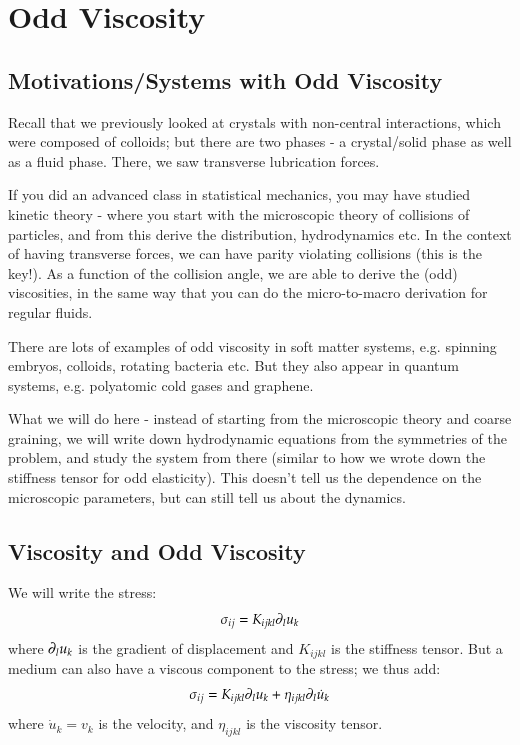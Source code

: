 \section{Odd Viscosity}

\subsection{Motivations/Systems with Odd Viscosity}
Recall that we previously looked at crystals with non-central interactions, which were composed of colloids; but there are two phases - a crystal/solid phase as well as a fluid phase. There, we saw transverse lubrication forces.

If you did an advanced class in statistical mechanics, you may have studied kinetic theory - where you start with the microscopic theory of collisions of particles, and from this derive the distribution, hydrodynamics etc. In the context of having transverse forces, we can have parity violating collisions (this is the key!). As a function of the collision angle, we are able to derive the (odd) viscosities, in the same way that you can do the micro-to-macro derivation for regular fluids.

There are lots of examples of odd viscosity in soft matter systems, e.g. spinning embryos, colloids, rotating bacteria etc. But they also appear in quantum systems, e.g. polyatomic cold gases and graphene.

What we will do here - instead of starting from the microscopic theory and coarse graining, we will write down hydrodynamic equations from the symmetries of the problem, and study the system from there (similar to how we wrote down the stiffness tensor for odd elasticity). This doesn't tell us the dependence on the microscopic parameters, but can still tell us about the dynamics.

\subsection{Viscosity and Odd Viscosity}
We will write the stress:
\begin{equation}
    \sigma_{ij} = K_{ijkl}\partial_l u_k
\end{equation}
where $\partial_l u_k$ is the gradient of displacement and $K_{ijkl}$ is the stiffness tensor. But a medium can also have a viscous component to the stress; we thus add:
\begin{equation}
    \sigma_{ij} = K_{ijkl}\partial_l u_k + \eta_{ijkl}\partial_l \dot{u}_k
\end{equation}
where $\dot{u}_k = v_k$ is the velocity, and $\eta_{ijkl}$ is the viscosity tensor.

